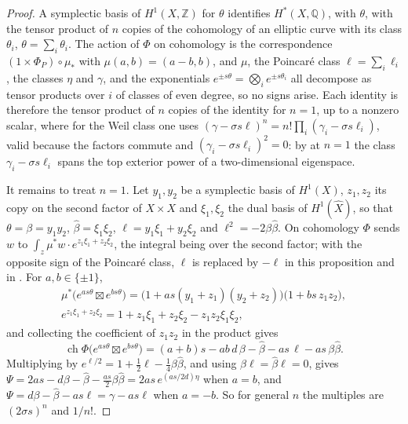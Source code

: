 \documentclass[11pt,reqno]{amsart}
\theoremstyle{plain}
\theoremstyle{definition}
\theoremstyle{remark}
\newcommand{\QQ}{\mathbb{Q}}
\newcommand{\ZZ}{\mathbb{Z}}
\DeclareMathOperator{\ch}{ch}
\begin{document}
\begin{proof}
A symplectic basis of $H^{1}(X,\ZZ)$ for $\theta$ identifies $H^{*}(X,\QQ)$,
with $\theta$, with the tensor product of $n$ copies of the cohomology of an
elliptic curve with its class $\theta_{i}$, $\theta=\sum_{i}\theta_{i}$. The
action of $\Phi$ on cohomology is the correspondence $(1\times\Phi_{P})\circ
\mu_{*}$ with $\mu(a,b)=(a-b,b)$, and $\mu$, the Poincar\'e class
$\ell=\sum_{i}\ell_{i}$, the classes $\eta$ and $\gamma$, and the exponentials
$e^{\pm s\theta}=\bigotimes_{i}e^{\pm s\theta_{i}}$ all decompose as tensor
products over $i$ of classes of even degree, so no signs arise. Each identity
is therefore the tensor product of $n$ copies of the identity for $n=1$, up to
a nonzero scalar, where for the Weil class one uses
$(\gamma-\sigma s\ell)^{n}=n!\prod_{i}(\gamma_{i}-\sigma s\ell_{i})$, valid because
the factors commute and $(\gamma_{i}-\sigma s\ell_{i})^{2}=0$: by
\cite[Theorem~15.2(i)]{paperI} at $n=1$ the class $\gamma_{i}-\sigma s\ell_{i}$
spans the top exterior power of a two-dimensional eigenspace.

It remains to treat $n=1$. Let $y_{1},y_{2}$ be a symplectic basis of
$H^{1}(X)$, $z_{1},z_{2}$ its copy on the second factor of $X\times X$ and
$\xi_{1},\xi_{2}$ the dual basis of $H^{1}(\widehat X)$, so that
$\theta=\beta=y_{1}y_{2}$, $\widehat\beta=\xi_{1}\xi_{2}$,
$\ell=y_{1}\xi_{1}+y_{2}\xi_{2}$ and $\ell^{2}=-2\beta\widehat\beta$. On
cohomology $\Phi$ sends $w$ to $\int_{z}\mu^{*}w\cdot e^{z_{1}\xi_{1}+z_{2}\xi_{2}}$,
the integral being over the second factor; with the opposite sign of the
Poincar\'e class, $\ell$ is replaced by $-\ell$ in this proposition and in
. For $a,b\in\{\pm1\}$,
\begin{gather*}
  \mu^{*}\bigl(e^{as\theta}\boxtimes e^{bs\theta}\bigr)
  =\bigl(1+as(y_{1}+z_{1})(y_{2}+z_{2})\bigr)\bigl(1+bs\,z_{1}z_{2}\bigr),\\
  e^{z_{1}\xi_{1}+z_{2}\xi_{2}}=1+z_{1}\xi_{1}+z_{2}\xi_{2}-z_{1}z_{2}\xi_{1}\xi_{2},
\end{gather*}
and collecting the coefficient of $z_{1}z_{2}$ in the product gives
\[
  \ch\Phi\bigl(e^{as\theta}\boxtimes e^{bs\theta}\bigr)
  =(a+b)s-ab\,d\,\beta-\widehat\beta-as\,\ell-as\,\beta\widehat\beta .
\]
Multiplying by $e^{\ell/2}=1+\frac12\ell-\frac14\beta\widehat\beta$, and using
$\beta\ell=\widehat\beta\ell=0$, gives
$\Psi=2as-d\beta-\widehat\beta-\frac{as}{2}\beta\widehat\beta=2as\,e^{(as/2d)\eta}$
when $a=b$, and $\Psi=d\beta-\widehat\beta-as\ell=\gamma-as\ell$ when $a=-b$.
So for general $n$ the multiples are $(2\sigma s)^{n}$ and $1/n!$.


\end{proof}
\end{document}
